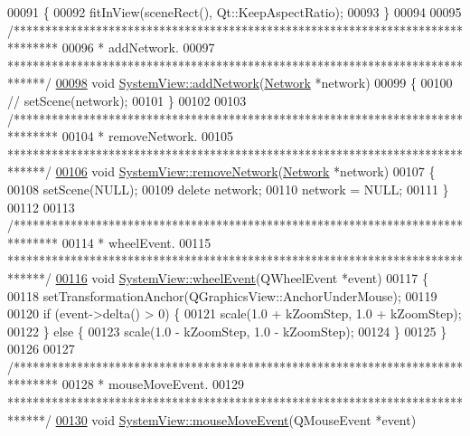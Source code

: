 \begin{DoxyCode}
00091 \{
00092   fitInView(sceneRect(), Qt::KeepAspectRatio);
00093 \}
00094 
00095 \textcolor{comment}{/*******************************************************************************}
00096 \textcolor{comment}{ * addNetwork.}
00097 \textcolor{comment}{ ******************************************************************************/}
\hypertarget{systemview_8cpp_source_l00098}{}\hyperlink{group___graphics_gae183447d0777c7b2b940a977f9b64c3f}{00098} \textcolor{keywordtype}{void} \hyperlink{group___graphics_gae183447d0777c7b2b940a977f9b64c3f}{SystemView::addNetwork}(\hyperlink{class_network}{Network} *network)
00099 \{
00100 \textcolor{comment}{//  setScene(network);}
00101 \}
00102 
00103 \textcolor{comment}{/*******************************************************************************}
00104 \textcolor{comment}{ * removeNetwork.}
00105 \textcolor{comment}{ ******************************************************************************/}
\hypertarget{systemview_8cpp_source_l00106}{}\hyperlink{group___graphics_ga2078ad08ff93b9a8683d567e3f9f714e}{00106} \textcolor{keywordtype}{void} \hyperlink{group___graphics_ga2078ad08ff93b9a8683d567e3f9f714e}{SystemView::removeNetwork}(\hyperlink{class_network}{Network} *network)
00107 \{
00108   setScene(NULL);
00109   \textcolor{keyword}{delete} network;
00110   network = NULL;
00111 \}
00112 
00113 \textcolor{comment}{/*******************************************************************************}
00114 \textcolor{comment}{ * wheelEvent.}
00115 \textcolor{comment}{ ******************************************************************************/}
\hypertarget{systemview_8cpp_source_l00116}{}\hyperlink{group___graphics_gaab2fa6cebf9022eb6bf31497c0789675}{00116} \textcolor{keywordtype}{void} \hyperlink{group___graphics_gaab2fa6cebf9022eb6bf31497c0789675}{SystemView::wheelEvent}(QWheelEvent *event)
00117 \{
00118   setTransformationAnchor(QGraphicsView::AnchorUnderMouse);
00119 
00120   \textcolor{keywordflow}{if} (event->delta() > 0) \{
00121     scale(1.0 + kZoomStep, 1.0 + kZoomStep);
00122   \} \textcolor{keywordflow}{else} \{
00123     scale(1.0 - kZoomStep, 1.0 - kZoomStep);
00124   \}
00125 \}
00126 
00127 \textcolor{comment}{/*******************************************************************************}
00128 \textcolor{comment}{ * mouseMoveEvent.}
00129 \textcolor{comment}{ ******************************************************************************/}
\hypertarget{systemview_8cpp_source_l00130}{}\hyperlink{group___graphics_gab19e233cd697852dd71140971cb6e122}{00130} \textcolor{keywordtype}{void} \hyperlink{group___graphics_gab19e233cd697852dd71140971cb6e122}{SystemView::mouseMoveEvent}(QMouseEvent *event)

\end{DoxyCode}
